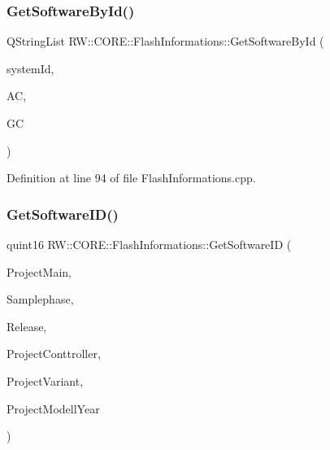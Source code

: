 \hypertarget{class_r_w_1_1_c_o_r_e_1_1_flash_informations_a54957a74376f4d9481b6e4a72ebd5aa9}{}\label{class_r_w_1_1_c_o_r_e_1_1_flash_informations_a54957a74376f4d9481b6e4a72ebd5aa9} 
\subsubsection{\texorpdfstring{Get\+Software\+By\+Id()}{GetSoftwareById()}}
{\footnotesize\ttfamily Q\+String\+List R\+W\+::\+C\+O\+R\+E\+::\+Flash\+Informations\+::\+Get\+Software\+By\+Id (\begin{DoxyParamCaption}\item[{int}]{system\+Id,  }\item[{bool}]{AC,  }\item[{bool}]{GC }\end{DoxyParamCaption})}



Definition at line 94 of file Flash\+Informations.\+cpp.

\hypertarget{class_r_w_1_1_c_o_r_e_1_1_flash_informations_a033177c5ea7b1b56ca7eac10f781c80b}{}\label{class_r_w_1_1_c_o_r_e_1_1_flash_informations_a033177c5ea7b1b56ca7eac10f781c80b} 
\subsubsection{\texorpdfstring{Get\+Software\+I\+D()}{GetSoftwareID()}}
{\footnotesize\ttfamily quint16 R\+W\+::\+C\+O\+R\+E\+::\+Flash\+Informations\+::\+Get\+Software\+ID (\begin{DoxyParamCaption}\item[{Q\+String}]{Project\+Main,  }\item[{Q\+String}]{Samplephase,  }\item[{Q\+String}]{Release,  }\item[{Q\+String}]{Project\+Conttroller,  }\item[{Q\+String}]{Project\+Variant,  }\item[{Q\+String}]{Project\+Modell\+Year }\end{DoxyParamCaption})}



